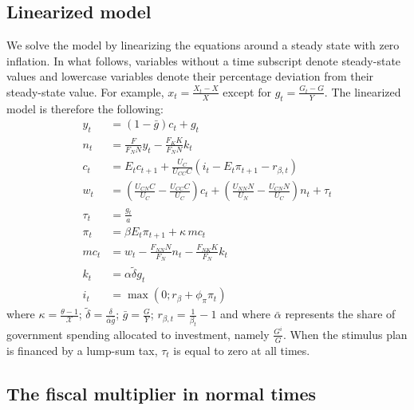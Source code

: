 \documentclass[12pt,letterpaper]{article}
\newcommand{\Et}{E_t}
\newcommand{\gbar}{\bar{g}}
\newcommand{\abar}{\bar{\alpha}}
\newcommand{\dtilde}{\tilde{\delta}}
\newcommand{\XX}{\mathcal{X}}
\begin{document}
\subsection{Linearized model}

We solve the model by linearizing the equations around a steady state with zero inflation. In what follows, variables without a time subscript denote steady-state values and lowercase variables denote their percentage deviation from their steady-state value. For example, $x_t = \frac{X_t - X}{X}$ except for $g_t = \frac{G_t - G}{Y}$. The linearized model is therefore the following:
\begin{align}
y_t &= (1-\gbar)c_t + g_t \tag{24}\\
n_t &= \frac{F}{F_N N}y_t - \frac{F_K K}{F_N N}k_t \tag{25}\\
c_t &= \Et c_{t+1} + \frac{U_C}{U_{CC}C}\left(i_t - \Et\pi_{t+1} - r_{\beta,t}\right) \tag{26}\\
w_t &= \left(\frac{U_{CN}C}{U_C} - \frac{U_{CC}C}{U_C}\right)c_t + \left(\frac{U_{NN}N}{U_N} - \frac{U_{CN}N}{U_C}\right)n_t + \tau_t \tag{27}\\
\tau_t &= \frac{g_t}{a} \tag{28}\\
\pi_t &= \beta\Et\pi_{t+1} + \kappa\, mc_t \tag{29}\\
mc_t &= w_t - \frac{F_{NN}N}{F_N}n_t - \frac{F_{NK}K}{F_N}k_t \tag{30}\\
k_t &= \alpha\dtilde g_t \tag{31}\\
i_t &= \max(0; r_\beta + \phi_\pi\pi_t) \tag{32}
\end{align}
where $\kappa = \frac{\theta-1}{\XX}$; $\dtilde = \frac{\delta}{\abar\gbar}$; $\gbar = \frac{G}{Y}$; $r_{\beta,t} = \frac{1}{\beta_t} - 1$ and where $\abar$ represents the share of government spending allocated to investment, namely $\frac{G^i}{G}$. When the stimulus plan is financed by a lump-sum tax, $\tau_t$ is equal to zero at all times.

\subsection{The fiscal multiplier in normal times}
\end{document}
